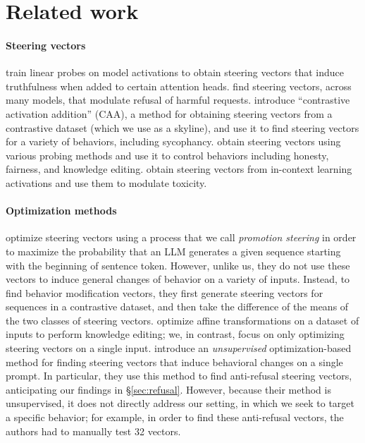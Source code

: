 \section{Related work}
\paragraph{Steering vectors}
\citet{li2024inference} train linear probes on model activations to obtain steering vectors that induce truthfulness when added to certain attention heads.
\citet{arditi2024refusal} find steering vectors, across many models, that modulate refusal of harmful requests. \citet{panickssery2023steering} introduce \enquote{contrastive activation addition} (CAA), a method for obtaining steering vectors from a contrastive dataset (which we use as a skyline), and use it to find steering vectors for a variety of behaviors, including sycophancy. \citet{zou2023representation} obtain steering vectors using various probing methods and use it to control behaviors including honesty, fairness, and knowledge editing. \citet{liu2023context} obtain steering vectors from in-context learning activations and use them to modulate toxicity. 

\paragraph{Optimization methods} \citet{subramani2022extractinglatentsteeringvectors} optimize steering vectors using a process that we call \textit{promotion steering} in order to maximize the probability that an LLM generates a given sequence starting with the beginning of sentence token. However, unlike us, they do not use these vectors to induce general changes of behavior on a variety of inputs. Instead, to find behavior modification vectors, they first generate steering vectors for sequences in a contrastive dataset, and then take the difference of the means of the two classes of steering vectors. \citet{hernandez2023inspecting} optimize affine transformations on a dataset of inputs to perform knowledge editing; we, in contrast, focus on only optimizing steering vectors on a single input. \citet{mack2024melbo} introduce an \textit{unsupervised} optimization-based method for finding steering vectors that induce behavioral changes on a single prompt. In particular, they use this method to find anti-refusal steering vectors, anticipating our findings in \S\ref{sec:refusal}. However, because their method is unsupervised, it does not directly address our setting, in which we seek to target a specific behavior; for example, in order to find these anti-refusal vectors, the authors had to manually test 32 vectors.

